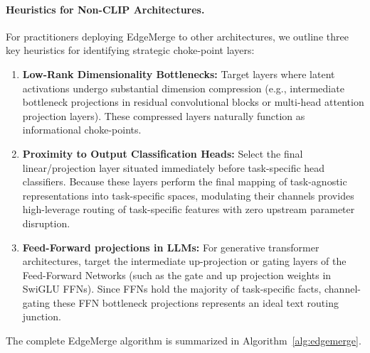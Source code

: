 \paragraph{Heuristics for Non-CLIP Architectures.} For practitioners deploying EdgeMerge to other architectures, we outline three key heuristics for identifying strategic choke-point layers:
\begin{enumerate}
    \item \textbf{Low-Rank Dimensionality Bottlenecks:} Target layers where latent activations undergo substantial dimension compression (e.g., intermediate bottleneck projections in residual convolutional blocks or multi-head attention projection layers). These compressed layers naturally function as informational choke-points.
    \item \textbf{Proximity to Output Classification Heads:} Select the final linear/projection layer situated immediately before task-specific head classifiers. Because these layers perform the final mapping of task-agnostic representations into task-specific spaces, modulating their channels provides high-leverage routing of task-specific features with zero upstream parameter disruption.
    \item \textbf{Feed-Forward projections in LLMs:} For generative transformer architectures, target the intermediate up-projection or gating layers of the Feed-Forward Networks (such as the gate and up projection weights in SwiGLU FFNs). Since FFNs hold the majority of task-specific facts, channel-gating these FFN bottleneck projections represents an ideal text routing junction.
\end{enumerate}

The complete EdgeMerge algorithm is summarized in Algorithm~\ref{alg:edgemerge}.

